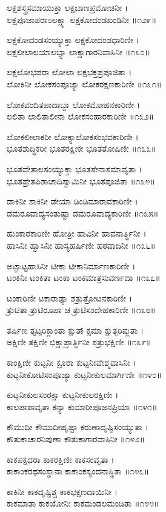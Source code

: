ಲಕ್ಷಶಸ್ತ್ರಸಮಾಯುಕ್ತಾ ಲಕ್ಷಬಾಣಪ್ರಮೋಚಿನೀ ।\\
ಲಕ್ಷಪೂಜಾಪರಾಽಲಕ್ಷ್ಯಾ ಲಕ್ಷಕೋದಂಡಖಂಡಿನೀ ॥೧೨೯॥

ಲಕ್ಷಕೋದಂಡಸಂಯ್ಯುಕ್ತಾ ಲಕ್ಷಕೋದಂಡಧಾರಿಣೀ ।\\
ಲಕ್ಷಲೀಲಾಲಯಾಲಭ್ಯಾ ಲಾಕ್ಷಾಗಾರನಿವಾಸಿನೀ ॥೧೩೦॥

ಲಕ್ಷಲೋಭಪರಾ ಲೋಲಾ ಲಕ್ಷಭಕ್ತಪ್ರಪೂಜಿತಾ ।\\
ಲೋಕಿನೀ ಲೋಕಸಂಪೂಜ್ಯಾ ಲೋಕರಕ್ಷಣಕಾರಿಣೀ ॥೧೩೧॥

ಲೋಕವಂದಿತಪಾದಾಬ್ಜಾ ಲೋಕಮೋಹನಕಾರಿಣೀ ।\\
ಲಲಿತಾ ಲಾಲಿತಾಲೀನಾ ಲೋಕಸಂಹಾರಕಾರಿಣೀ ॥೧೩೨॥

ಲೋಕಲೀಲಾಕರೀ ಲೋಕ್ಯಾಲೋಕಸಂಭವಕಾರಿಣೀ ।\\
ಭೂತಶುದ್ಧಿಕರೀ ಭೂತರಕ್ಷಿಣೀ ಭೂತತೋಷಿಣೀ ॥೧೩೩॥

ಭೂತವೇತಾಲಸಂಯ್ಯುಕ್ತಾ ಭೂತಸೇನಾಸಮಾವೃತಾ ।\\
ಭೂತಪ್ರೇತಪಿಶಾಚಾದಿಸ್ವಾಮಿನೀ ಭೂತಪೂಜಿತಾ ॥೧೩೪॥

ಡಾಕಿನೀ ಶಾಕಿನೀ ಡೇಯಾ ಡಿಂಡಿಮಾರಾವಕಾರಿಣೀ ।\\
ಡಮರೂವಾದ್ಯಸಂತುಷ್ಟಾ ಡಮರೂವಾದ್ಯಕಾರಿಣೀ ॥೧೩೫॥

ಹುಂಕಾರಕಾರಿಣೀ ಹೋತ್ರೀ ಹಾವಿನೀ ಹಾವನಾರ್ತ್ಥಿನೀ ।\\
ಹಾಸಿನೀ ಹ್ವಾಸಿನೀ ಹಾಸ್ಯಹರ್ಷಿಣೀ ಹಠವಾದಿನೀ ॥೧೩೬॥

ಅಟ್ಟಾಟ್ಟಹಾಸಿನೀ ಟೀಕಾ ಟೀಕಾನಿರ್ಮಾಣಕಾರಿಣೀ ।\\
ಟಂಕಿನೀ ಟಂಕಿತಾ ಟಂಕಾ ಟಂಕಮಾತ್ರಸುವರ್ಣದಾ ॥೧೩೭॥

ಟಂಕಾರಿಣೀ ಟಕಾರಾಢ್ಯಾ ಶತ್ರುತ್ರೋಟನಕಾರಿಣೀ ।\\
ತ್ರುಟಿತಾ ತ್ರುಟಿರೂಪಾ ಚ ತ್ರುಟಿಸಂದೇಹಕಾರಿಣೀ ॥೧೩೮॥

ತರ್ಷಿಣ ತೃಟ್ಪರಿಕ್ಲಾಂತಾ ಕ್ಷುತ್ಕ್ಷಾಮಾ ಕ್ಷುತ್ಪರಿಪ್ಲುತಾ ।\\
ಅಕ್ಷಿಣೀ ತಕ್ಷಿಣೀ ಭಿಕ್ಷಾಪ್ರಾರ್ತ್ಥಿನೀ ಶತ್ರುಭಕ್ಷಿಣೀ ॥೧೩೯॥

ಕಾಂಕ್ಷಿಣೀ ಕುಟ್ಟನೀ ಕ್ರೂರಾ ಕುಟ್ಟನೀವೇಶ್ಮವಾಸಿನೀ ।\\
ಕುಟ್ಟನೀಕೋಟಿಸಂಪೂಜ್ಯಾ ಕುಟ್ಟನೀಕುಲಮಾರ್ಗಿಣೀ ॥೧೪೦॥

ಕುಟ್ಟನೀಕುಲಸಂರಕ್ಷಾ ಕುಟ್ಟನೀಕುಲರಕ್ಷಿಣೀ ।\\
ಕಾಲಪಾಶಾವೃತಾ ಕನ್ಯಾ ಕುಮಾರೀಪೂಜನಪ್ರಿಯಾ ॥೧೪೧॥

ಕೌಮುದೀ ಕೌಮುದೀಹೃಷ್ಟಾ ಕರುಣಾದೃಷ್ಟಿಸಂಯ್ಯುತಾ ।\\
ಕೌತುಕಾಚಾರನಿಪುಣಾ ಕೌತುಕಾಗಾರವಾಸಿನೀ ॥೧೪೨॥

ಕಾಕಪಕ್ಷಧರಾ ಕಾಕರಕ್ಷಿಣೀ ಕಾಕಸಂವೃತಾ ।\\
ಕಾಕಾಂಕರಥಸಂಸ್ಥಾನಾ ಕಾಕಾಂಕಸ್ಯಂದನಾಸ್ಥಿತಾ ॥೧೪೩॥

ಕಾಕಿನೀ ಕಾಕದೃಷ್ಟಿಶ್ಚ ಕಾಕಭಕ್ಷಣದಾಯಿನೀ ।\\
ಕಾಕಮಾತಾ ಕಾಕಯೋನಿಃ ಕಾಕಮಂಡಲಮಂಡಿತಾ ॥೧೪೪॥

